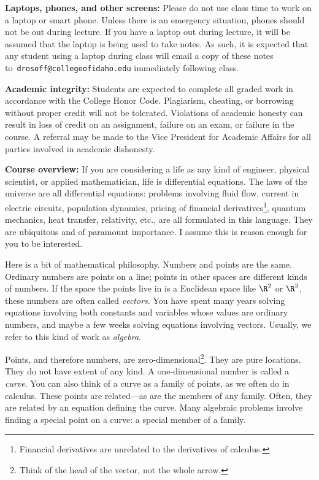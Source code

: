 \documentclass[11pt]{amsart}
\begin{document}
\textbf{Laptops, phones, and other screens:} Please do not use class time to work on a laptop or smart phone. Unless there is an emergency situation, phones should not be out during lecture. If you have a laptop out during lecture, it will be assumed that the laptop is being used to take notes. As such, it is expected that any student using a laptop during class will email a copy of these notes to~\nolinkurl{drosoff@collegeofidaho.edu} immediately following class. 

\textbf{Academic integrity:} Students are expected to complete all graded work in accordance with the College Honor Code. Plagiarism, cheating, or borrowing without proper credit will not be tolerated.  Violations of academic honesty can result in loss of credit on an assignment, failure on an exam, or failure in the course. A referral may be made to the Vice President for Academic Affairs for all parties involved in academic dishonesty.

\textbf{Course overview:} If you are considering a life as any kind of engineer, physical scientist, or applied mathematician, life is differential equations. The laws of the universe are all differential equations: problems involving fluid flow, current in electric circuits, population dynamics, pricing of financial derivatives\footnote{Financial derivatives are unrelated to the derivatives of calculus.}, quantum mechanics, heat transfer, relativity, etc., are all formulated in this language. They are ubiquitous and of paramount importance. I assume this is reason enough for you to be interested.

Here is a bit of mathematical philosophy. Numbers and points are the same. Ordinary numbers are points on a line; points in other spaces are different kinds of numbers. If the space the points live in is a Euclidean space like $\R^2$ or $\R^3$, these numbers are often called \emph{vectors}. You have spent many years solving equations involving both constants and variables whose values are ordinary numbers, and maybe a few weeks solving equations involving vectors. Usually, we refer to this kind of work as \emph{algebra}. 

Points, and therefore numbers, are zero-dimensional\footnote{Think of the head of the vector, not the whole arrow.}. They are pure locations. They do not have extent of any kind. A one-dimensional number is called a \emph{curve}. You can also think of a curve as a family of points, as we often do in calculus. These points are related---as are the members of any family. Often, they are related by an equation defining the curve. Many algebraic problems involve finding a special point on a curve: a special member of a family.
\end{document}

